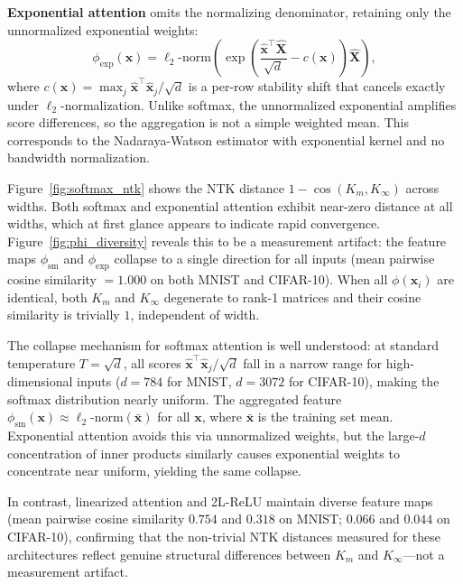 \documentclass{article}
\theoremstyle{plain}
\theoremstyle{definition}
\theoremstyle{remark}
\begin{document}
\textbf{Exponential attention} omits the normalizing denominator, retaining only the unnormalized exponential weights:
\begin{equation}
\phi_{\text{exp}}(\mathbf{x}) = \ell_2\text{-norm}\!\left(\exp\!\left(\frac{\hat{\mathbf{x}}^\top \hat{\mathbf{X}}}{\sqrt{d}} - c(\mathbf{x})\right)\hat{\mathbf{X}}\right),
\end{equation}
where $c(\mathbf{x}) = \max_j \hat{\mathbf{x}}^\top \hat{\mathbf{x}}_j / \sqrt{d}$ is a per-row stability shift that cancels exactly under $\ell_2$-normalization. Unlike softmax, the unnormalized exponential amplifies score differences, so the aggregation is not a simple weighted mean. This corresponds to the Nadaraya-Watson estimator with exponential kernel and no bandwidth normalization.

Figure~\ref{fig:softmax_ntk} shows the NTK distance $1 - \cos(K_m, K_\infty)$ across widths. Both softmax and exponential attention exhibit near-zero distance at all widths, which at first glance appears to indicate rapid convergence. Figure~\ref{fig:phi_diversity} reveals this to be a measurement artifact: the feature maps $\phi_{\text{sm}}$ and $\phi_{\text{exp}}$ collapse to a single direction for all inputs (mean pairwise cosine similarity $= 1.000$ on both MNIST and CIFAR-10). When all $\phi(\mathbf{x}_i)$ are identical, both $K_m$ and $K_\infty$ degenerate to rank-1 matrices and their cosine similarity is trivially $1$, independent of width.

The collapse mechanism for softmax attention is well understood: at standard temperature $T = \sqrt{d}$, all scores $\hat{\mathbf{x}}^\top \hat{\mathbf{x}}_j / \sqrt{d}$ fall in a narrow range for high-dimensional inputs ($d = 784$ for MNIST, $d = 3072$ for CIFAR-10), making the softmax distribution nearly uniform. The aggregated feature $\phi_{\text{sm}}(\mathbf{x}) \approx \ell_2\text{-norm}(\bar{\mathbf{x}})$ for all $\mathbf{x}$, where $\bar{\mathbf{x}}$ is the training set mean. Exponential attention avoids this via unnormalized weights, but the large-$d$ concentration of inner products similarly causes exponential weights to concentrate near uniform, yielding the same collapse.

In contrast, linearized attention and 2L-ReLU maintain diverse feature maps (mean pairwise cosine similarity $0.754$ and $0.318$ on MNIST; $0.066$ and $0.044$ on CIFAR-10), confirming that the non-trivial NTK distances measured for these architectures reflect genuine structural differences between $K_m$ and $K_\infty$---not a measurement artifact.
\end{document}
